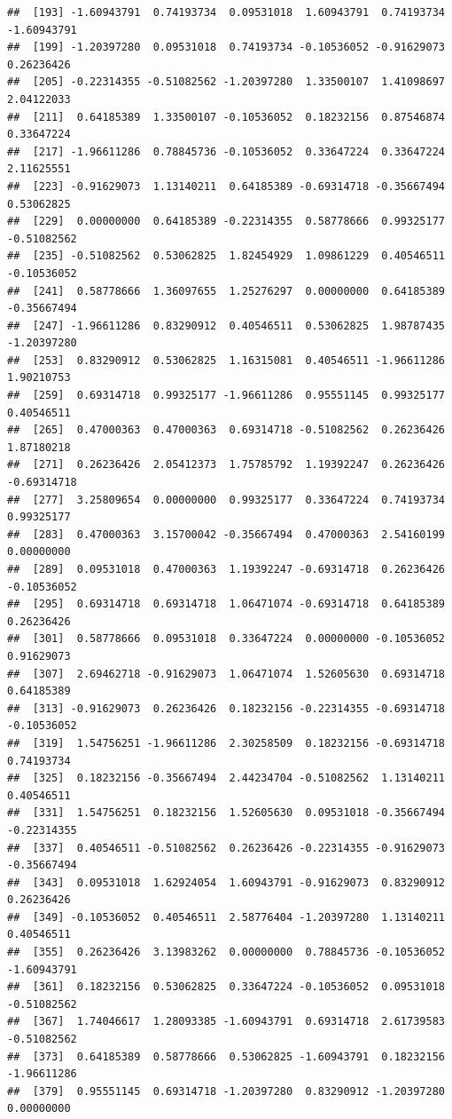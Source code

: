 \documentclass[
]{article}
\begin{document}
\begin{verbatim}
##  [193] -1.60943791  0.74193734  0.09531018  1.60943791  0.74193734 -1.60943791
##  [199] -1.20397280  0.09531018  0.74193734 -0.10536052 -0.91629073  0.26236426
##  [205] -0.22314355 -0.51082562 -1.20397280  1.33500107  1.41098697  2.04122033
##  [211]  0.64185389  1.33500107 -0.10536052  0.18232156  0.87546874  0.33647224
##  [217] -1.96611286  0.78845736 -0.10536052  0.33647224  0.33647224  2.11625551
##  [223] -0.91629073  1.13140211  0.64185389 -0.69314718 -0.35667494  0.53062825
##  [229]  0.00000000  0.64185389 -0.22314355  0.58778666  0.99325177 -0.51082562
##  [235] -0.51082562  0.53062825  1.82454929  1.09861229  0.40546511 -0.10536052
##  [241]  0.58778666  1.36097655  1.25276297  0.00000000  0.64185389 -0.35667494
##  [247] -1.96611286  0.83290912  0.40546511  0.53062825  1.98787435 -1.20397280
##  [253]  0.83290912  0.53062825  1.16315081  0.40546511 -1.96611286  1.90210753
##  [259]  0.69314718  0.99325177 -1.96611286  0.95551145  0.99325177  0.40546511
##  [265]  0.47000363  0.47000363  0.69314718 -0.51082562  0.26236426  1.87180218
##  [271]  0.26236426  2.05412373  1.75785792  1.19392247  0.26236426 -0.69314718
##  [277]  3.25809654  0.00000000  0.99325177  0.33647224  0.74193734  0.99325177
##  [283]  0.47000363  3.15700042 -0.35667494  0.47000363  2.54160199  0.00000000
##  [289]  0.09531018  0.47000363  1.19392247 -0.69314718  0.26236426 -0.10536052
##  [295]  0.69314718  0.69314718  1.06471074 -0.69314718  0.64185389  0.26236426
##  [301]  0.58778666  0.09531018  0.33647224  0.00000000 -0.10536052  0.91629073
##  [307]  2.69462718 -0.91629073  1.06471074  1.52605630  0.69314718  0.64185389
##  [313] -0.91629073  0.26236426  0.18232156 -0.22314355 -0.69314718 -0.10536052
##  [319]  1.54756251 -1.96611286  2.30258509  0.18232156 -0.69314718  0.74193734
##  [325]  0.18232156 -0.35667494  2.44234704 -0.51082562  1.13140211  0.40546511
##  [331]  1.54756251  0.18232156  1.52605630  0.09531018 -0.35667494 -0.22314355
##  [337]  0.40546511 -0.51082562  0.26236426 -0.22314355 -0.91629073 -0.35667494
##  [343]  0.09531018  1.62924054  1.60943791 -0.91629073  0.83290912  0.26236426
##  [349] -0.10536052  0.40546511  2.58776404 -1.20397280  1.13140211  0.40546511
##  [355]  0.26236426  3.13983262  0.00000000  0.78845736 -0.10536052 -1.60943791
##  [361]  0.18232156  0.53062825  0.33647224 -0.10536052  0.09531018 -0.51082562
##  [367]  1.74046617  1.28093385 -1.60943791  0.69314718  2.61739583 -0.51082562
##  [373]  0.64185389  0.58778666  0.53062825 -1.60943791  0.18232156 -1.96611286
##  [379]  0.95551145  0.69314718 -1.20397280  0.83290912 -1.20397280  0.00000000

\end{verbatim}
\end{document}
